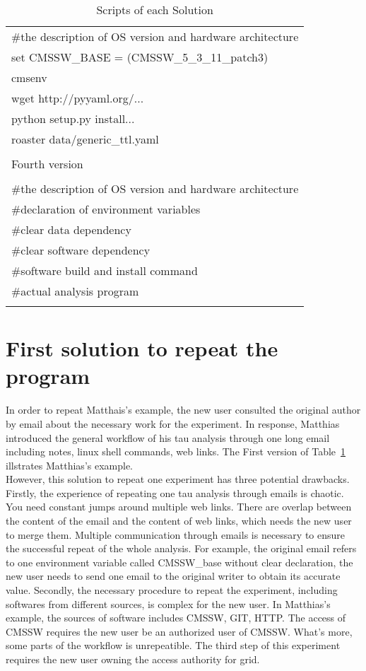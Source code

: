 \documentclass{article}
\begin{document}
\begin{table}
\begin{tabular}{|l|}
        \#the description of OS version and hardware architecture \\
        set CMSSW\_BASE = (CMSSW\_5\_3\_11\_patch3) \\ 
        cmsenv \\
        wget http://pyyaml.org/... \\
        python setup.py install... \\
        roaster data/generic\_ttl.yaml \\
        \\ \hline
        Fourth version \\ \hline
        \\
        \#the description of OS version and hardware architecture \\
        \#declaration of environment variables\\
        \#clear data dependency\\
        \#clear software dependency\\
        \#software build and install command\\
        \#actual analysis program\\ 
        \\ \hline
    \end{tabular}
    \caption{Scripts of each Solution}
    \label{table:scripts}
\end{table}
\section{First solution to repeat the program}
\indent In order to repeat Matthais's example, the new user consulted the original author by email about the necessary work for the experiment. In response, Matthias introduced the general workflow of his tau analysis through one long email including notes, linux shell commands, web links. The First version of Table~\ref{table:scripts} illstrates Matthias's example.\\

However, this solution to repeat one experiment has three potential drawbacks. Firstly, the experience of repeating one tau analysis through emails is chaotic. You need constant jumps around multiple web links. There are overlap between the content of the email and the content of web links, which needs the new user to merge them. Multiple communication through emails is necessary to ensure the successful repeat of the whole analysis. For example, the original email refers to one environment variable called CMSSW\_base without clear declaration, the new user needs to send one email to the original writer to obtain its accurate value. Secondly, the necessary procedure to repeat the experiment, including softwares from different sources, is complex for the new user. In Matthias's example, the sources of software includes CMSSW, GIT, HTTP. The access of CMSSW requires the new user be an authorized user of CMSSW. What’s more, some parts of the workflow is unrepeatible. The third step of this experiment requires the new user owning the access authority for grid. \\
\end{document}
